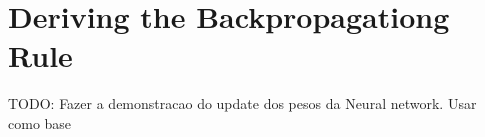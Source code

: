 \chapter{Deriving the Backpropagationg Rule} \label{appendix-a}

TODO: Fazer a demonstracao do update dos pesos da Neural network. Usar como base \cite{Roth_2016}




